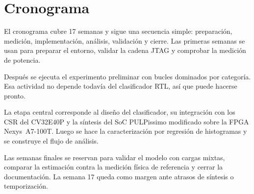 \chapter{Cronograma}
\label{ch:cron}

El cronograma cubre 17 semanas y sigue una secuencia simple: preparación, medición, implementación, análisis, validación y cierre. Las primeras semanas se usan para preparar el entorno, validar la cadena JTAG y comprobar la medición de potencia.

Después se ejecuta el experimento preliminar con bucles dominados por categoría. Esa actividad no depende todavía del clasificador RTL, así que puede hacerse pronto.

La etapa central corresponde al diseño del clasificador, su integración con los CSR del CV32E40P y la síntesis del SoC PULPissimo modificado sobre la FPGA Nexys~A7-100T. Luego se hace la caracterización por regresión de histogramas y se construye el flujo de análisis.

Las semanas finales se reservan para validar el modelo con cargas mixtas, comparar la estimación contra la medición física de referencia y cerrar la documentación. La semana 17 queda como margen ante atrasos de síntesis o temporización.


\newcommand{\prep}{\cellcolor{ganttPrep}}
\newcommand{\meas}{\cellcolor{ganttMeas}}
\newcommand{\rtl}{\cellcolor{ganttRTL}}
\newcommand{\ana}{\cellcolor{ganttAna}}
\newcommand{\val}{\cellcolor{ganttVal}}
\newcommand{\doc}{\cellcolor{ganttDoc}}
\newcommand{\legendbox}[1]{\cellcolor{#1}\hspace{1.2em}}

